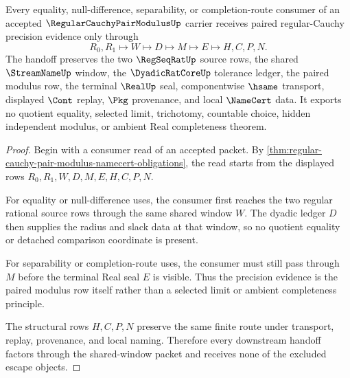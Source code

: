 \begin{theorem}
\label{thm:regular-cauchy-pair-modulus-shared-window-handoff}
Every equality, null-difference, separability, or completion-route consumer of an accepted $\RegularCauchyPairModulusUp$ carrier receives paired regular-Cauchy precision evidence only through
$$
R_0,R_1 \longmapsto W \longmapsto D \longmapsto M \longmapsto E \longmapsto H,C,P,N .
$$
The handoff preserves the two $\RegSeqRatUp$ source rows, the shared $\StreamNameUp$ window, the $\DyadicRatCoreUp$ tolerance ledger, the paired modulus row, the terminal $\RealUp$ seal, componentwise $\hsame$ transport, displayed $\Cont$ replay, $\Pkg$ provenance, and local $\NameCert$ data. It exports no quotient equality, selected limit, trichotomy, countable choice, hidden independent modulus, or ambient Real completeness theorem.
\end{theorem}
\begin{proof}
Begin with a consumer read of an accepted packet. By \autoref{thm:regular-cauchy-pair-modulus-namecert-obligations}, the read starts from the displayed rows $R_0,R_1,W,D,M,E,H,C,P,N$.

For equality or null-difference uses, the consumer first reaches the two regular rational source rows through the same shared window $W$. The dyadic ledger $D$ then supplies the radius and slack data at that window, so no quotient equality or detached comparison coordinate is present.

For separability or completion-route uses, the consumer must still pass through $M$ before the terminal Real seal $E$ is visible. Thus the precision evidence is the paired modulus row itself rather than a selected limit or ambient completeness principle.

The structural rows $H,C,P,N$ preserve the same finite route under transport, replay, provenance, and local naming. Therefore every downstream handoff factors through the shared-window packet and receives none of the excluded escape objects.
\end{proof}



